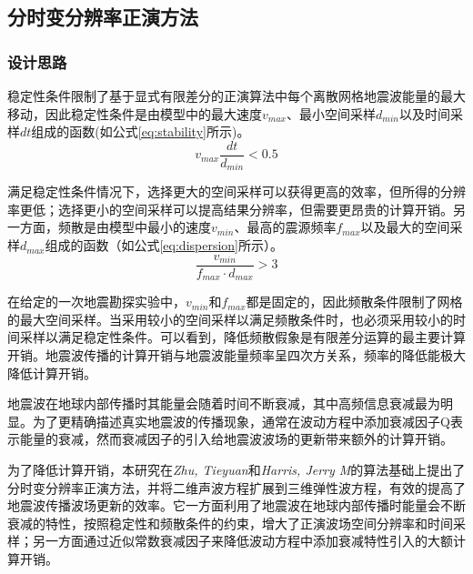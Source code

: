
\subsection{分时变分辨率正演方法} %
\label{sec:分时变分辨率正演方法}

\subsubsection{设计思路}

稳定性条件限制了基于显式有限差分的正演算法中每个离散网格地震波能量的最大移动，因此稳定性条件是由模型中的最大速度$v_{max}$、最小空间采样$d_{min}$以及时间采样$dt$组成的函数(如公式\ref{eq:stability}所示)。
\begin{equation}
  v_{max} \frac{dt}{d_{min}} < 0.5
  \label{eq:stability}
\end{equation}

满足稳定性条件情况下，选择更大的空间采样可以获得更高的效率，但所得的分辨率更低；选择更小的空间采样可以提高结果分辨率，但需要更昂贵的计算开销。另一方面，频散是由模型中最小的速度$v_{min}$、最高的震源频率$f_{max}$以及最大的空间采样$d_{max}$组成的函数（如公式\ref{eq:dispersion}所示）。
\begin{equation}
  \frac{v_{min}}{f_{max}\cdot d_{max}} > 3
  \label{eq:dispersion}
\end{equation}

在给定的一次地震勘探实验中，$v_{min}$和$f_{max}$都是固定的，因此频散条件限制了网格的最大空间采样。当采用较小的空间采样以满足频散条件时，也必须采用较小的时间采样以满足稳定性条件。可以看到，降低频散假象是有限差分运算的最主要计算开销。地震波传播的计算开销与地震波能量频率呈四次方关系，频率的降低能极大降低计算开销。

地震波在地球内部传播时其能量会随着时间不断衰减，其中高频信息衰减最为明显。为了更精确描述真实地震波的传播现象，通常在波动方程中添加衰减因子Q表示能量的衰减，然而衰减因子的引入给地震波波场的更新带来额外的计算开销。

为了降低计算开销，本研究在\emph{Zhu, Tieyuan}和\emph{Harris, Jerry M}\cite{zhu2014modeling}的算法基础上提出了分时变分辨率正演方法，并将二维声波方程扩展到三维弹性波方程，有效的提高了地震波传播波场更新的效率。它一方面利用了地震波在地球内部传播时能量会不断衰减的特性，按照稳定性和频散条件的约束，增大了正演波场空间分辨率和时间采样；另一方面通过近似常数衰减因子来降低波动方程中添加衰减特性引入的大额计算开销。

